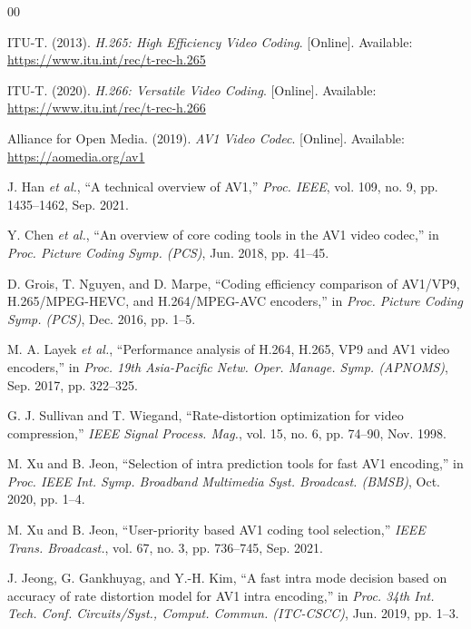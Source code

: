 \documentclass[conference]{IEEEtran}
\begin{document}
\begin{thebibliography}{00}

 ITU-T. (2013). \emph{H.265: High Efficiency Video Coding}. [Online]. Available: \url{https://www.itu.int/rec/t-rec-h.265}

 ITU-T. (2020). \emph{H.266: Versatile Video Coding}. [Online]. Available: \url{https://www.itu.int/rec/t-rec-h.266}

 Alliance for Open Media. (2019). \emph{AV1 Video Codec}. [Online]. Available: \url{https://aomedia.org/av1}

 J. Han \emph{et al.}, ``A technical overview of AV1,'' \emph{Proc. IEEE}, vol. 109, no. 9, pp. 1435--1462, Sep. 2021.

 Y. Chen \emph{et al.}, ``An overview of core coding tools in the AV1 video codec,'' in \emph{Proc. Picture Coding Symp. (PCS)}, Jun. 2018, pp. 41--45.

 D. Grois, T. Nguyen, and D. Marpe, ``Coding efficiency comparison of AV1/VP9, H.265/MPEG-HEVC, and H.264/MPEG-AVC encoders,'' in \emph{Proc. Picture Coding Symp. (PCS)}, Dec. 2016, pp. 1--5.

 M. A. Layek \emph{et al.}, ``Performance analysis of H.264, H.265, VP9 and AV1 video encoders,'' in \emph{Proc. 19th Asia-Pacific Netw. Oper. Manage. Symp. (APNOMS)}, Sep. 2017, pp. 322--325.

 G. J. Sullivan and T. Wiegand, ``Rate-distortion optimization for video compression,'' \emph{IEEE Signal Process. Mag.}, vol. 15, no. 6, pp. 74--90, Nov. 1998.

 M. Xu and B. Jeon, ``Selection of intra prediction tools for fast AV1 encoding,'' in \emph{Proc. IEEE Int. Symp. Broadband Multimedia Syst. Broadcast. (BMSB)}, Oct. 2020, pp. 1--4.

 M. Xu and B. Jeon, ``User-priority based AV1 coding tool selection,'' \emph{IEEE Trans. Broadcast.}, vol. 67, no. 3, pp. 736--745, Sep. 2021.

 J. Jeong, G. Gankhuyag, and Y.-H. Kim, ``A fast intra mode decision based on accuracy of rate distortion model for AV1 intra encoding,'' in \emph{Proc. 34th Int. Tech. Conf. Circuits/Syst., Comput. Commun. (ITC-CSCC)}, Jun. 2019, pp. 1--3.


\end{thebibliography}
\end{document}

